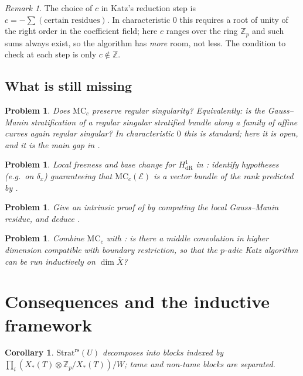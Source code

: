 \documentclass[11pt,reqno]{amsart}
\newcommand{\Zp}{\mathbb{Z}_p}
\newcommand{\ZZ}{\mathbb{Z}}
\newcommand{\cE}{\mathcal{E}}
\newcommand{\Strat}{\mathrm{Strat}}
\newcommand{\rs}{\mathrm{rs}}
\newcommand{\MC}{\mathrm{MC}}
\newcommand{\Xst}{X_*(T)}
\newcommand{\dR}{\mathrm{dR}}
\theoremstyle{plain}
\newtheorem{corollary}[theorem]{Corollary}
\newtheorem{problem}[theorem]{Problem}
\theoremstyle{definition}
\theoremstyle{remark}
\newtheorem{remark}[theorem]{Remark}
\numberwithin{equation}{section}
\begin{document}
\begin{remark}
The choice of $c$ in Katz's reduction step is $c=-\sum(\text{certain
residues})$.  In characteristic $0$ this requires a root of unity of the
right order in the coefficient field; here $c$ ranges over the ring $\Zp$
and such sums always exist, so the algorithm has \emph{more} room, not
less.  The condition to check at each step is only $c\notin\ZZ$.
\end{remark}

\subsection{What is still missing}

\begin{problem}\label{prob:MCrs}
Does $\MC_c$ preserve regular singularity?  Equivalently: is the
Gauss--Manin stratification of a regular singular stratified bundle along
a family of affine curves again regular singular?  In characteristic $0$
this is standard; here it is open, and it is the main gap in
.
\end{problem}

\begin{problem}
Local freeness and base change for $H^1_{\dR}$ in
: identify hypotheses (e.g.\ on $\delta_x$) guaranteeing that
$\MC_c(\cE)$ is a vector bundle of the rank predicted by
.
\end{problem}

\begin{problem}
Give an intrinsic proof of  by computing the local
Gauss--Manin residue, and deduce .
\end{problem}

\begin{problem}
Combine $\MC_c$ with : is there a middle convolution in
higher dimension compatible with boundary restriction, so that the
$p$-adic Katz algorithm can be run inductively on $\dim\bar X$?
\end{problem}

\section{Consequences and the inductive framework}\label{sec:applications}

\begin{corollary}\label{cor:blocks2}
$\Strat^{\rs}(U)$ decomposes into blocks indexed by
$\prod_i(\Xst\otimes\Zp/\Xst)/W$; tame and non-tame blocks are separated.
\end{corollary}
\end{document}
